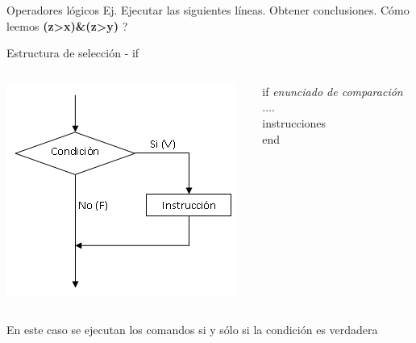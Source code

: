 \documentclass{bredelebeamer}
\begin{document}
\begin{frame}{Operadores lógicos}
Ej. Ejecutar las siguientes líneas. Obtener conclusiones.
Cómo leemos \textbf{(z>x)\&(z>y)} ?
\end{frame}

\begin{frame}{Estructura de selección - if}
\begin{columns}
\begin{column}{0.5\textwidth}
\begin{center}
\includegraphics[scale=0.5]{images/pantalla5.png}
\end{center}
\end{column}
\begin{column}{0.3\textwidth}
if \textit{enunciado de comparación}\\
	....\\
    instrucciones\\
end
\end{column}
\end{columns}
\begin{center}
En este caso se ejecutan los comandos si y sólo si la condición es verdadera
\end{center}
\end{frame}
\end{document}
